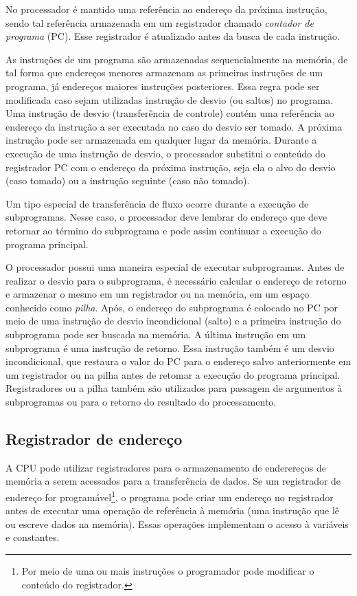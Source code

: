 \documentclass[11pt,a4paper]{report}
\begin{document}
No processador é mantido uma referência ao endereço da próxima instrução,
sendo tal referência armazenada em um registrador chamado \textit{contador
de programa} (PC). Esse registrador é atualizado antes da busca de cada
instrução.

As instruções de um programa são armazenadas sequencialmente na memória,
de tal forma que endereços menores armazenam as primeiras instruções de
um programa, já endereços maiores instruções posteriores. Essa regra pode
ser modificada caso sejam utilizadas instrução de desvio (ou saltos) no
programa. Uma instrução de desvio (transferência de controle) contém uma
referência ao endereço da instrução a ser executada no caso do desvio ser
tomado. A próxima instrução pode ser armazenada em qualquer lugar da
memória. Durante a execução de uma instrução de desvio, o processador
substitui o conteúdo do registrador PC com o endereço da próxima
instrução, seja ela o alvo do desvio (caso tomado) ou a instrução
seguinte (caso não tomado).

Um tipo especial de transferência de fluxo ocorre durante a execução
de subprogramas. Nesse caso, o processador deve lembrar do endereço que
deve retornar ao término do subprograma e pode assim continuar a execução
do programa principal.

O processador possui uma maneira especial de executar subprogramas. Antes
de realizar o desvio para o subprograma, é necessário calcular o endereço
de retorno e armazenar o mesmo em um registrador ou na memória, em um
espaço conhecido como \textit{pilha}. Após, o endereço do subprograma
é colocado no PC por meio de uma instrução de desvio incondicional (salto)
e a primeira instrução do subprograma pode ser buscada na memória. A
última instrução em um subprograma é uma instrução de retorno. Essa
instrução também é um desvio incondicional, que restaura o valor do PC
para o endereço salvo anteriormente em um registrador ou na pilha antes
de retomar a execução do programa principal. Registradores ou a pilha
também são utilizados para passagem de argumentos à subprogramas ou para
o retorno do resultado do processamento.

\subsection{Registrador de endereço}

A CPU pode utilizar registradores para o armazenamento de enderereços
de memória a serem acessados para a transferência de dados. Se um
registrador de endereço for programável\footnote{Por meio de uma ou
mais instruções o programador pode modificar o conteúdo do registrador.},
o programa pode criar um endereço no registrador antes de executar uma
operação de referência à memória (uma instrução que lê ou escreve dados
na memória). Essas operações implementam o acesso à variáveis e constantes.
\end{document}
